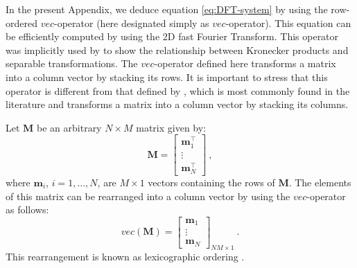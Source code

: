 
In the present Appendix, we deduce equation \ref{eq:DFT-system}
by using the row-ordered $vec$-operator (here designated simply as $vec$-operator).
This equation can be efficiently computed by using the 2D 
fast Fourier Transform. 
This operator was implicitly used by \citet[][ p. 31]{jain1989} to 
show the relationship between Kronecker products and separable 
transformations. The $vec$-operator defined here 
transforms a matrix into a column vector by stacking its rows. It is important 
to stress that this operator is different from that defined by \citet{neudecker1969}, which 
is most commonly found in the literature and 
transforms a matrix into a column vector by stacking its columns.

Let $\mathbf{M}$ be an arbitrary $N \times M$ matrix given by:
\begin{equation}
\mathbf{M} = \begin{bmatrix}
\mathbf{m}^{\top}_{1} \\ 
\vdots \\
\mathbf{m}^{\top}_{N}
\end{bmatrix} \: ,
\label{eq:matrix-M}
\end{equation}
where $\mathbf{m}_{i}$, $i = 1, \dots, N$, are $M \times 1$ vectors containing 
the rows of $\mathbf{M}$.
The elements of this matrix can be rearranged into a column vector by using the
$vec$-operator \citep[][ p. 31]{jain1989} as follows:
\begin{equation}
vec \left( \mathbf{M} \right) = \begin{bmatrix}
\mathbf{m}_{1} \\
\vdots \\
\mathbf{m}_{N}
\end{bmatrix}_{NM \times 1} \: .
\label{eq:vec-operator}
\end{equation}
This rearrangement is known as lexicographic ordering \citep[][ p. 150]{jain1989}.

